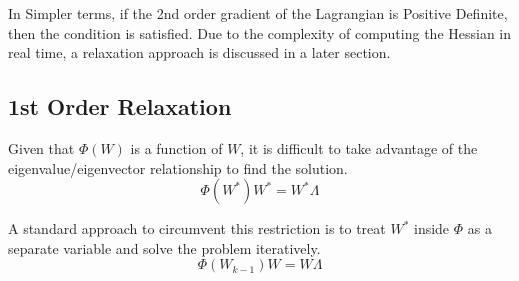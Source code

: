 \documentclass{article}
\begin{document}
In Simpler terms, if the 2nd order gradient of the Lagrangian is Positive
Definite, then the condition is satisfied. Due to the complexity of computing
the Hessian in real time, a relaxation approach is discussed in a later
section.





\subsection{1st Order Relaxation}



Given that $\Phi ( W)$ is a function of $W$, it is difficult to take advantage
of the eigenvalue/eigenvector relationship to find the solution.
\[ \Phi ( W^{\ast}) W^{\ast} = W^{\ast} \Lambda \]


A standard approach to circumvent this restriction is to treat $W^{\ast}$
inside $\Phi$ as a separate variable and solve the problem iteratively.
\[ \Phi ( W_{k - 1}) W = W \Lambda \]
\end{document}
